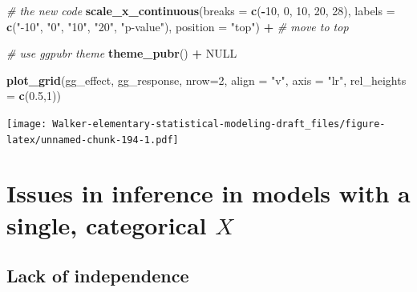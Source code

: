 \documentclass[]{book}
\newenvironment{Shaded}{\begin{snugshade}}{\end{snugshade}}
\newcommand{\CommentTok}[1]{\textcolor[rgb]{0.56,0.35,0.01}{\textit{#1}}}
\newcommand{\DataTypeTok}[1]{\textcolor[rgb]{0.13,0.29,0.53}{#1}}
\newcommand{\DecValTok}[1]{\textcolor[rgb]{0.00,0.00,0.81}{#1}}
\newcommand{\FloatTok}[1]{\textcolor[rgb]{0.00,0.00,0.81}{#1}}
\newcommand{\KeywordTok}[1]{\textcolor[rgb]{0.13,0.29,0.53}{\textbf{#1}}}
\newcommand{\NormalTok}[1]{#1}
\newcommand{\OperatorTok}[1]{\textcolor[rgb]{0.81,0.36,0.00}{\textbf{#1}}}
\newcommand{\OtherTok}[1]{\textcolor[rgb]{0.56,0.35,0.01}{#1}}
\newcommand{\StringTok}[1]{\textcolor[rgb]{0.31,0.60,0.02}{#1}}
\begin{document}
\begin{Shaded}
\begin{Highlighting}[]
\StringTok{  }
\StringTok{  }\CommentTok{# the new code}
\StringTok{  }\KeywordTok{scale_x_continuous}\NormalTok{(}\DataTypeTok{breaks =} \KeywordTok{c}\NormalTok{(}\OperatorTok{-}\DecValTok{10}\NormalTok{, }\DecValTok{0}\NormalTok{, }\DecValTok{10}\NormalTok{, }\DecValTok{20}\NormalTok{, }\DecValTok{28}\NormalTok{),}
                     \DataTypeTok{labels =} \KeywordTok{c}\NormalTok{(}\StringTok{"-10"}\NormalTok{, }\StringTok{"0"}\NormalTok{, }\StringTok{"10"}\NormalTok{, }\StringTok{"20"}\NormalTok{, }\StringTok{"p-value"}\NormalTok{),}
                     \DataTypeTok{position =} \StringTok{"top"}\NormalTok{) }\OperatorTok{+}\StringTok{ }\CommentTok{# move to top}

\StringTok{  }\CommentTok{# use ggpubr theme}
\StringTok{  }\KeywordTok{theme_pubr}\NormalTok{() }\OperatorTok{+}
\StringTok{  }
\StringTok{  }\OtherTok{NULL}
\end{Highlighting}
\end{Shaded}

\begin{Shaded}
\begin{Highlighting}[]
\KeywordTok{plot_grid}\NormalTok{(gg_effect,}
\NormalTok{          gg_response,}
          \DataTypeTok{nrow=}\DecValTok{2}\NormalTok{,}
          \DataTypeTok{align =} \StringTok{"v"}\NormalTok{,}
          \DataTypeTok{axis =} \StringTok{"lr"}\NormalTok{,}
          \DataTypeTok{rel_heights =} \KeywordTok{c}\NormalTok{(}\FloatTok{0.5}\NormalTok{,}\DecValTok{1}\NormalTok{))}
\end{Highlighting}
\end{Shaded}

\texttt{[image: Walker-elementary-statistical-modeling-draft\_files/figure-latex/unnamed-chunk-194-1.pdf]}

\hypertarget{issues-in-inference-in-models-with-a-single-categorical-x}{%
\section{\texorpdfstring{Issues in inference in models with a single, categorical \(X\)}{Issues in inference in models with a single, categorical X}}\label{issues-in-inference-in-models-with-a-single-categorical-x}}

\hypertarget{lack-of-independence}{%
\subsection{Lack of independence}\label{lack-of-independence}}
\end{document}
